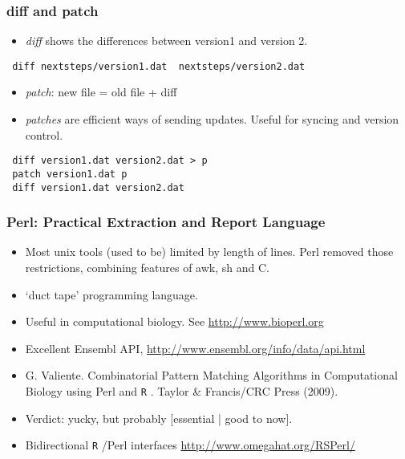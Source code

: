 \documentclass{beamer}
\newcommand{\R}{\texttt{R} }
\begin{document}
\begin{frame}[fragile]
\frametitle{diff and patch}
\label{sec-1-4}


\begin{itemize}
\item \emph{diff} shows the differences between version1 and version 2.
\end{itemize}

\begin{verbatim}
 diff nextsteps/version1.dat  nextsteps/version2.dat
\end{verbatim}

\begin{itemize}
\item \emph{patch}:  new file = old file + diff
\end{itemize}


\begin{itemize}
\item \emph{patches} are efficient ways of sending updates.  Useful for syncing
  and version control.
\end{itemize}

\begin{verbatim}
 diff version1.dat version2.dat > p
 patch version1.dat p
 diff version1.dat version2.dat
\end{verbatim}
\end{frame}
\begin{frame}
\frametitle{Perl: Practical Extraction and Report Language}
\label{sec-1-5}


\begin{itemize}
\item Most unix tools (used to be) limited by length of lines.  Perl
  removed those restrictions, combining features of awk, sh and C.
\item `duct tape' programming language.
\item Useful in computational biology.  See \href{http://www.bioperl.org}{http://www.bioperl.org}
\item Excellent Ensembl API, \href{http://www.ensembl.org/info/data/api.html}{http://www.ensembl.org/info/data/api.html}
\item G. Valiente. Combinatorial Pattern Matching Algorithms in Computational Biology using Perl and \R. Taylor \& Francis/CRC Press (2009).
\item Verdict: yucky, but probably [essential | good to now].
\item Bidirectional \R/Perl interfaces \href{http://www.omegahat.org/RSPerl/}{http://www.omegahat.org/RSPerl/}
\end{itemize}
\end{frame}
\end{document}
